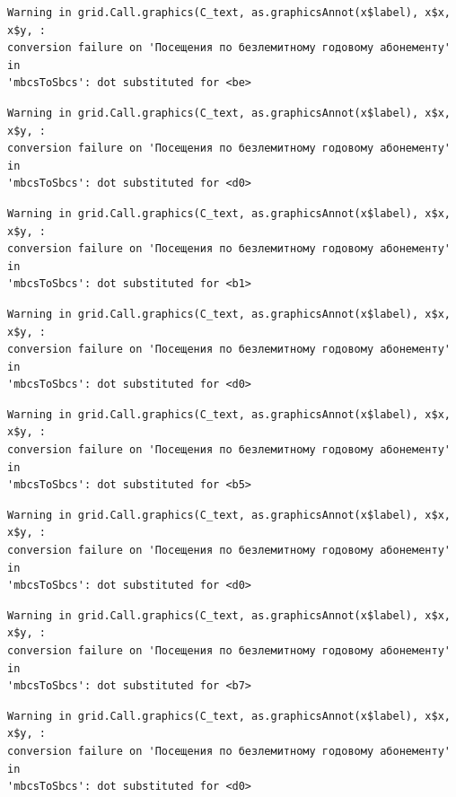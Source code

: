 \documentclass[
  letterpaper,
  DIV=11,
  numbers=noendperiod]{scrartcl}
\begin{document}
\begin{verbatim}
Warning in grid.Call.graphics(C_text, as.graphicsAnnot(x$label), x$x, x$y, :
conversion failure on 'Посещения по безлемитному годовому абонементу' in
'mbcsToSbcs': dot substituted for <be>
\end{verbatim}

\begin{verbatim}
Warning in grid.Call.graphics(C_text, as.graphicsAnnot(x$label), x$x, x$y, :
conversion failure on 'Посещения по безлемитному годовому абонементу' in
'mbcsToSbcs': dot substituted for <d0>
\end{verbatim}

\begin{verbatim}
Warning in grid.Call.graphics(C_text, as.graphicsAnnot(x$label), x$x, x$y, :
conversion failure on 'Посещения по безлемитному годовому абонементу' in
'mbcsToSbcs': dot substituted for <b1>
\end{verbatim}

\begin{verbatim}
Warning in grid.Call.graphics(C_text, as.graphicsAnnot(x$label), x$x, x$y, :
conversion failure on 'Посещения по безлемитному годовому абонементу' in
'mbcsToSbcs': dot substituted for <d0>
\end{verbatim}

\begin{verbatim}
Warning in grid.Call.graphics(C_text, as.graphicsAnnot(x$label), x$x, x$y, :
conversion failure on 'Посещения по безлемитному годовому абонементу' in
'mbcsToSbcs': dot substituted for <b5>
\end{verbatim}

\begin{verbatim}
Warning in grid.Call.graphics(C_text, as.graphicsAnnot(x$label), x$x, x$y, :
conversion failure on 'Посещения по безлемитному годовому абонементу' in
'mbcsToSbcs': dot substituted for <d0>
\end{verbatim}

\begin{verbatim}
Warning in grid.Call.graphics(C_text, as.graphicsAnnot(x$label), x$x, x$y, :
conversion failure on 'Посещения по безлемитному годовому абонементу' in
'mbcsToSbcs': dot substituted for <b7>
\end{verbatim}

\begin{verbatim}
Warning in grid.Call.graphics(C_text, as.graphicsAnnot(x$label), x$x, x$y, :
conversion failure on 'Посещения по безлемитному годовому абонементу' in
'mbcsToSbcs': dot substituted for <d0>
\end{verbatim}
\end{document}
